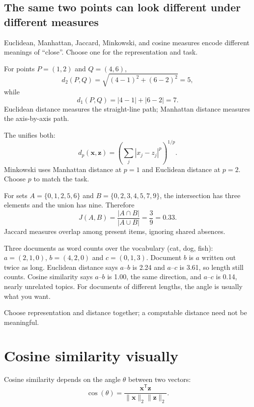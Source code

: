 \subsection*{The same two points can look different under different measures}

Euclidean, Manhattan, Jaccard, Minkowski, and cosine measures encode different meanings of ``close''. Choose one for the representation and task.

\begin{workedexample}
For points $P=(1,2)$ and $Q=(4,6)$,
\[
 d_2(P,Q)=\sqrt{(4-1)^2+(6-2)^2}=5,
\]
while
\[
 d_1(P,Q)=|4-1|+|6-2|=7.
\]
Euclidean distance measures the straight-line path; Manhattan distance measures the axis-by-axis path.
\end{workedexample}

The  unifies both:
\[
 d_p(\bm{x},\bm{z})=
 \left(\sum_j |x_j-z_j|^p\right)^{1/p}.
\]
Minkowski uses Manhattan distance at $p=1$ and Euclidean distance at $p=2$. Choose $p$ to match the task.

\begin{workedexample}
For sets $A=\{0,1,2,5,6\}$ and $B=\{0,2,3,4,5,7,9\}$, the intersection has three elements and the union has nine. Therefore
\[
 J(A,B)=\frac{|A\cap B|}{|A\cup B|}=\frac{3}{9}=0.33.
\]
Jaccard measures overlap among present items, ignoring shared absences.
\end{workedexample}

\begin{workedexample}
Three documents as word counts over the vocabulary (cat, dog, fish): $a=(2,1,0)$, $b=(4,2,0)$ and $c=(0,1,3)$. Document $b$ is $a$ written out twice as long. Euclidean distance says $a$--$b$ is 2.24 and $a$--$c$ is 3.61, so length still counts. Cosine similarity says $a$--$b$ is 1.00, the same direction, and $a$--$c$ is 0.14, nearly unrelated topics. For documents of different lengths, the angle is usually what you want.
\end{workedexample}

\begin{keyidea}
Choose representation and distance together; a computable distance need not be meaningful.
\end{keyidea}

\section{Cosine similarity visually}

Cosine similarity depends on the angle $\theta$ between two vectors:
\[
  \cos(\theta)=\frac{\bm{x}^{\mathsf T}\bm{z}}{\|\bm{x}\|_2\|\bm{z}\|_2}.
\]

